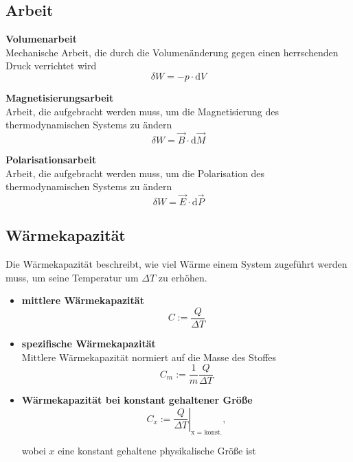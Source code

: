 \documentclass{article}
\newcommand{\diff}{\mathrm{d}}
\begin{document}
\newpage


\subsection{Arbeit}
	\begin{itemize}
		\item \textbf{Volumenarbeit}\\
		Mechanische Arbeit, die durch die Volumenänderung gegen einen herrschenden Druck verrichtet wird
			\begin{equation}
				\delta W = -p \cdot \diff V
			\end{equation}
		
		{\color{red}
		\item \textbf{Magnetisierungsarbeit}\\
		Arbeit, die aufgebracht werden muss, um die Magnetisierung des thermodynamischen Systems zu ändern
			\begin{equation}
				\delta W = \vec{B} \cdot \diff \vec{M}
			\end{equation}
		
		
		\item \textbf{Polarisationsarbeit}\\
		Arbeit, die aufgebracht werden muss, um die Polarisation des thermodynamischen Systems zu ändern
			\begin{equation}
				\delta W = \vec{E} \cdot \diff\vec{P}
			\end{equation}
		}
	\end{itemize}


\subsection{Wärmekapazität}
Die Wärmekapazität beschreibt, wie viel Wärme einem System zugeführt werden muss, um seine Temperatur um $\Delta T$ zu erhöhen.
	\begin{itemize}
		\item \textbf{mittlere Wärmekapazität}
			\begin{equation}
				C := \frac{Q}{\Delta T}
			\end{equation}
		
		
		\item \textbf{spezifische Wärmekapazität}\\
		Mittlere Wärmekapazität normiert auf die Masse des Stoffes
			\begin{equation}
				C_m := \frac{1}{m} \frac{Q}{\Delta T}
			\end{equation}
		
		
		\item \textbf{Wärmekapazität bei konstant gehaltener Größe}
			\begin{equation}
				C_x := \left. \frac{Q}{\Delta T} \right|_\text{x = konst.},
			\end{equation}
		
		wobei $x$ eine konstant gehaltene physikalische Größe ist
	\end{itemize}
\end{document}
